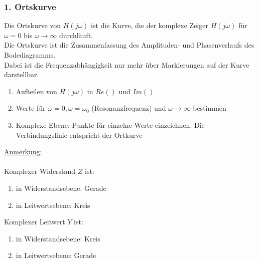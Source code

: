 \documentclass[a4paper,twocolumn,10pt]{article}
\begin{document}
\subsubsection*{1. Ortskurve}
Die Ortskurve von $H(j\omega)$ ist die Kurve, die der komplexe Zeiger $H(j\omega)$ für $\omega =0$ bis $\omega \rightarrow \infty$ durchläuft.\\
Die Ortskurve ist die Zusammenfassung des Amplituden- und Phasenverlaufs des Bodediagramms.\\
Dabei ist die Frequenzabhängigkeit nur mehr über Markierungen auf der Kurve darstellbar.
\begin{enumerate}[leftmargin=3mm]
	\item Aufteilen von $H(j\omega)$ in $Re()$ und $Im()$
	\item Werte für $\omega =0, \omega =\omega_0$ (Resonanzfrequenz) und $\omega \rightarrow\infty$ bestimmen
	\item Komplexe Ebene: Punkte für einzelne Werte einzeichnen. Die Verbindungslinie entspricht der Ortkurve
\end{enumerate}
\underline{Anmerkung:}\\\\
Komplexer Widerstand $Z$ ist:
\begin{enumerate}[label=-,leftmargin=3mm]
	\item in Widerstandsebene: Gerade
	\item in Leitwertsebene: Kreis
\end{enumerate}
Komplexer Leitwert $Y$ ist:
\begin{enumerate}[label=-,leftmargin=3mm]
	\item in Widerstandsebene: Kreis
	\item in Leitwertsebene: Gerade
\end{enumerate}
\end{document}

